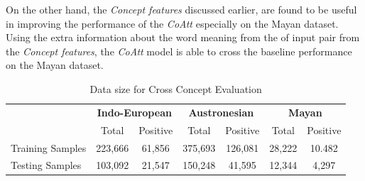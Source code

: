 \documentclass[11pt,letterpaper]{article}
\begin{document}
On the other hand, the \textit{Concept features} discussed earlier, are found to be useful in improving the performance of the \textit{CoAtt} especially on the Mayan dataset. Using the extra information about the word meaning from the of input pair from the \textit{Concept features}, the \textit{CoAtt} model is able to cross the baseline performance on the Mayan dataset.

\begin{table}[t]
\centering
\begin{tabular}{lcccccc}
\multicolumn{1}{c}{\textbf{}} & \multicolumn{2}{c}{\textbf{Indo-European}} & \multicolumn{2}{c}{\textbf{Austronesian}} & \multicolumn{2}{c}{\textbf{Mayan}} \\
\multicolumn{1}{c}{}          & Total               & Positive             & Total               & Positive            & Total           & Positive         \\
Training Samples              & 223,666             & 61,856               & 375,693             & 126,081             & 28,222          & 10.482           \\
Testing Samples               & 103,092             & 21,547               & 150,248             & 41,595              & 12,344          & 4,297           
\end{tabular}
\caption{Data size for Cross Concept Evaluation}
\label{CC_count}
\end{table}
\end{document}

